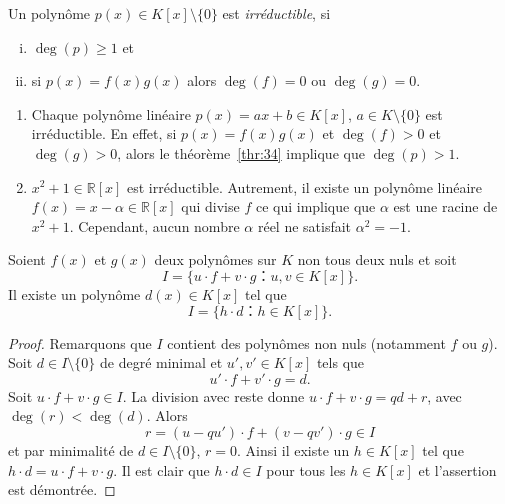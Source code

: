 \begin{definition}
  \label{def:53}
  Un polynôme $p(x) ∈ K[x] \setminus \{0\}$ est \emph{irréductible}, si
  \begin{enumerate}[i)]
  \item $\deg(p) ≥1$ et
  \item  si $p(x) = f(x) g(x)$ alors $\deg(f) = 0$ ou $\deg(g) = 0$. 
  \end{enumerate}
\end{definition}

\begin{example}
  \label{exe:46}
  \begin{enumerate}
  \item   Chaque polynôme linéaire $p(x) = ax + b ∈ K[x]$, $a ∈ K \setminus\{0\}$ est irréductible. En effet, si $p(x) = f(x) g(x)$ et $\deg(f)>0$ et $\deg(g)>0$, alors le théorème~\ref{thr:34} implique que $\deg(p) >1$.
  \item $x^2 +1 ∈ℝ[x]$ est irréductible. Autrement, il existe un polynôme linéaire $f(x) =  x - α ∈ ℝ[x]$ qui divise $f$ ce qui implique que $α$ est une racine de $x^2 +1$. Cependant, aucun nombre $α$ réel ne satisfait $α^2 = -1$.
  \end{enumerate}
\end{example}

\begin{theorem}
  \label{thr:54}
  Soient $f(x)$ et $g(x)$ deux polynômes sur $K$ non tous deux nuls et soit 
  \begin{displaymath}
    I = \{ u ⋅ f + v ⋅ g ： u,v ∈ K[x]\}.
  \end{displaymath}
  Il existe un  polynôme $d(x)∈K[x]$ tel que
  \begin{equation}
    \label{eq:51}
    I = \{ h ⋅ d ： h ∈ K[x]\}. 
  \end{equation}
\end{theorem}

\begin{proof}
  Remarquons que $I$ contient des polynômes non nuls (notamment $f$ ou $g$). Soit $d ∈ I \setminus \{0\}$ de degré minimal et $u',v' ∈ K[x]$ tels que
  \begin{displaymath}
    u' ⋅ f + v' ⋅g = d. 
  \end{displaymath}
  Soit $u⋅f + v⋅ g ∈ I$. La division avec reste donne $u⋅f + v⋅ g = qd +r$, avec $\deg(r) < \deg(d)$. Alors
  \begin{displaymath}
    r = (u - qu') ⋅ f + (v - qv') ⋅ g ∈ I
  \end{displaymath}
  et par minimalité de $d ∈ I \setminus\{0\}$, $r=0$. Ainsi il existe un $h∈K[x]$ tel que $h⋅d =  u⋅f + v⋅ g$. Il est clair que $h⋅d ∈I$ pour tous les $h ∈K[x]$ et l'assertion est démontrée.   
\end{proof}


